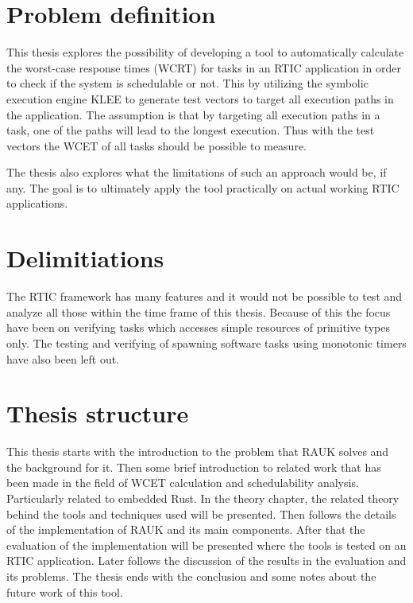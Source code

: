 \section{Problem definition}
This thesis explores the possibility of developing a tool to automatically
calculate the worst-case response times (WCRT) for tasks in an RTIC application
in order to check if the system is schedulable or not. This by utilizing the
symbolic execution engine KLEE to generate test vectors to target all execution
paths in the application. The assumption is that by targeting all execution
paths in a task, one of the paths will lead to the longest execution. Thus
with the test vectors the WCET of all tasks should be possible to measure.

The thesis also explores what the limitations of such an approach would be, if
any. The goal is to ultimately apply the tool practically on actual working
RTIC applications.

\section{Delimitiations}
The RTIC framework has many features and it would not be possible to test and
analyze all those within the time frame of this thesis. Because of this the
focus have been on verifying tasks which accesses simple resources of primitive
types only. The testing and verifying of spawning software tasks using
monotonic timers have also been left out.

\section{Thesis structure}
This thesis starts with the introduction to the problem that RAUK solves and
the background for it. Then some brief introduction to related work that has
been made in the field of WCET calculation and schedulability analysis.
Particularly related to embedded Rust. In the theory chapter, the related
theory behind the tools and techniques used will be presented. Then follows
the details of the implementation of RAUK and its main components. After that
the evaluation of the implementation will be presented where the tools is
tested on an RTIC application. Later follows the discussion of the results
in the evaluation and its problems. The thesis ends with the conclusion and
some notes about the future work of this tool.
